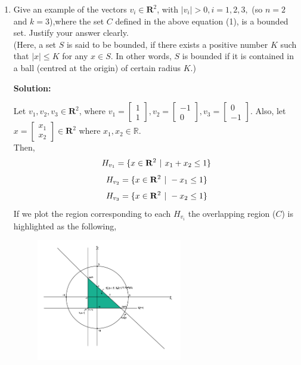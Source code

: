 \documentclass[12pt]{article}
\newenvironment{solution}
  {\par\noindent\textbf{Solution:}\par}
  {\par}
\begin{document}
\begin{enumerate}
\begin{enumerate}[label=\alph*.]
   \item Give an example of the vectors $v_i \in \mathbf{R}^2$, with $\vert v_i \vert  > 0, i= 1,2,3,$ (so $n=2$ and $k=3$),where the set $C$ defined in the above equation (1), is a bounded set. Justify your answer clearly. \\ (Here, a set $S$ is said to be bounded, if there exists a positive number $K$ such that $\vert x \vert \le K$ for any $x \in S$. In other words, $S$ is bounded if it is contained in a ball (centred at the origin) of certain radius $K$.)
  \begin{solution}
    Let $v_1,v_2,v_3 \in \mathbf{R}^2$, where $v_1= \begin{bmatrix} 1 \\ 1\end{bmatrix}, v_2 = \begin{bmatrix} -1 \\ 0 \end{bmatrix} , v_3 = \begin{bmatrix} 0 \\ -1 \end{bmatrix}$. Also, let $x = \begin{bmatrix} x_1 \\ x_2 \end{bmatrix} \in \mathbf{R}^2$ where $x_1,x_2 \in \mathbb{R}$.\\ Then,
    $$H_{v_1} = \{ x \in \mathbf{R}^2 \hspace{.05in} \vert \hspace{.05in} x_1 + x_2 \le 1 \} $$
    $$H_{v_2} = \{ x \in \mathbf{R}^2 \hspace{.05in} \vert \hspace{.05in} -x_1\le 1 \} $$
$$H_{v_3} = \{ x \in \mathbf{R}^2 \hspace{.05in} \vert \hspace{.05in}  -x_2 \le 1 \} $$
If we plot the region corresponding to each $H_{v_i}$ the overlapping region ($C$) is highlighted as the following,
  \\  
\begin{figure}[H]
\centering
\includegraphics[width=0.6\textwidth]{figure1.jpg} 


\end{figure}
\end{solution}
\end{enumerate}
\end{enumerate}
\end{document}
